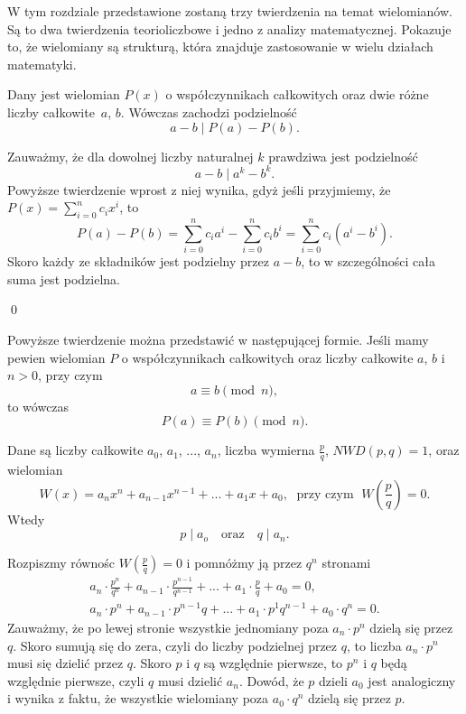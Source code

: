 

\noindent
W tym rozdziale przedstawione zostaną trzy twierdzenia na temat wielomianów. Są to dwa twierdzenia teorioliczbowe i jedno z analizy matematycznej. Pokazuje to, że wielomiany są strukturą, która znajduje zastosowanie w wielu działach matematyki.

\vspace{10px}

\noindent
Dany jest wielomian $P(x)$ o współczynnikach całkowitych oraz dwie różne liczby całkowite~$a$, $b$. Wówczas zachodzi podzielność
\[
	a - b \mid P(a) - P(b).
\]


\noindent
Zauważmy, że dla dowolnej liczby naturalnej $k$ prawdziwa jest podzielność
\[
	a - b \mid a^k - b^k.
\]
Powyższe twierdzenie wprost z niej wynika, gdyż jeśli przyjmiemy, że $P(x) = \sum^{n}_{i = 0} c_ix^i$, to
\[
	P(a) - P(b) = \sum^{n}_{i = 0} c_ia^i - \sum^{n}_{i = 0} c_ib^i = \sum^{n}_{i = 0} c_i(a^i - b^i).
\]
Skoro każdy ze składników jest podzielny przez $a - b$, to w szczególności cała suma jest podzielna.

\qed

\noindent
Powyższe twierdzenie można przedstawić w następującej formie. Jeśli mamy pewien wielomian $P$ o współczynnikach całkowitych oraz liczby całkowite $a$, $b$ i $n > 0$, przy czym
\[
	a \equiv b \pmod{n},
\]
to wówczas
\[
	P(a) \equiv P(b) \pmod{n}.
\]




\noindent
Dane są liczby całkowite $a_0$, $a_1$, ..., $a_n$, liczba wymierna $\frac{p}{q}$, $NWD(p, q) = 1$, oraz wielomian 
\[
	W(x) = a_nx^n + a_{n - 1}x^{n - 1} + ... + a_1x + a_0, \; \text{ przy czym } \; W\left(\frac{p}{q}\right) = 0.
\] 
 Wtedy
\[
	p \mid a_o \quad \text{oraz} \quad q \mid a_{n}.
\]


\noindent
Rozpiszmy równośc $W\left(\frac{p}{q}\right) = 0$ i pomnóżmy ją przez $q^n$ stronami
\begin{align*}
	a_n \cdot \frac{p^n}{q^n} + a_{n - 1} \cdot \frac{p^{n - 1}}{q^{n - 1}} + ... + a_1 \cdot \frac{p}{q} + a_0 = 0, \\
	a_n \cdot p^n + a_{n - 1} \cdot p^{n-1}q + ... + a_1 \cdot p^1q^{n - 1} + a_0 \cdot q^n = 0.
\end{align*}
Zauważmy, że po lewej stronie wszystkie jednomiany poza $a_n \cdot p^n$ dzielą się przez $q$. Skoro sumują się do zera, czyli do liczby podzielnej przez $q$, to liczba $a_n \cdot p^n$ musi się dzielić przez $q$. Skoro $p$ i $q$ są względnie pierwsze, to $p^n$ i $q$ będą względnie pierwsze, czyli $q$ musi dzielić $a_n$. Dowód, że $p$ dzieli $a_0$ jest analogiczny i wynika z faktu, że wszystkie wielomiany poza $a_0 \cdot q^n$ dzielą się przez $p$.

